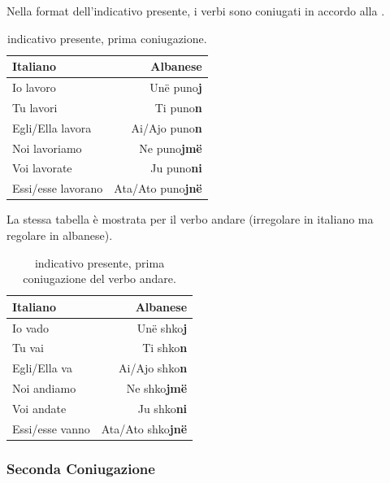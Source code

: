 Nella format dell'indicativo presente, i verbi sono coniugati in accordo alla .

\begin{table}[H]
    \centering
    \begin{tabular}{lr}
        \toprule
        Italiano    &   Albanese\\
        \midrule
        Io lavoro           &   Unë puno\textbf{j} \\
        Tu lavori           &   Ti puno\textbf{n} \\
        Egli/Ella lavora    &   Ai/Ajo puno\textbf{n} \\
        Noi lavoriamo       &   Ne puno\textbf{jmë} \\
        Voi lavorate        &   Ju puno\textbf{ni} \\
        Essi/esse lavorano  &   Ata/Ato puno\textbf{jnë} \\
        \bottomrule
    \end{tabular}
    \caption{indicativo presente, prima coniugazione.}
    \label{tbl:verb:primaconiugazione:indicativo:presente}
\end{table}

La stessa tabella è mostrata per il verbo andare (irregolare in italiano ma regolare in albanese).

\begin{table}[H]
    \centering
    \begin{tabular}{lr}
        \toprule
        Italiano    &   Albanese\\
        \midrule
        Io vado           &   Unë shko\textbf{j} \\
        Tu vai           &   Ti shko\textbf{n} \\
        Egli/Ella va    &   Ai/Ajo shko\textbf{n} \\
        Noi andiamo       &   Ne shko\textbf{jmë} \\
        Voi andate        &   Ju shko\textbf{ni} \\
        Essi/esse vanno  &   Ata/Ato shko\textbf{jnë} \\
        \bottomrule
    \end{tabular}
    \caption{indicativo presente, prima coniugazione del verbo andare.}
    \label{tbl:verb:andare:primaconiugazione:indicativo:presente}
\end{table}

\subsubsection{Seconda Coniugazione}

